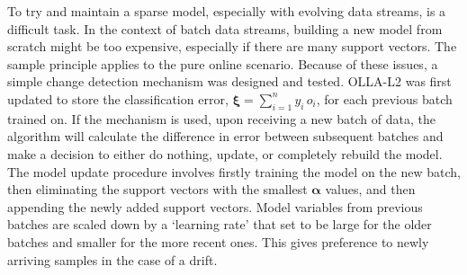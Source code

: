 \documentclass[reqno]{vcuthesis}
\numberwithin{equation}{chapter}
\begin{document}
To try and maintain a sparse model, especially with evolving data streams, is a difficult task. In the context of batch data streams, building a new model from scratch might be too expensive, especially if there are many support vectors. The sample principle applies to the pure online scenario. Because of these issues, a simple change detection mechanism was designed and tested. OLLA-L2 was first updated to store the classification error, $\bm \xi = \sum_{i=1}^n y_i\, o_i$, for each previous batch trained on. If the mechanism is used, upon receiving a new batch of data, the algorithm will calculate the difference in error between subsequent batches and make a decision to either do nothing, update, or completely rebuild the model. The model update procedure involves firstly training the model on the new batch, then eliminating the support vectors with the smallest $\bm \alpha$ values, and then appending the newly added support vectors. Model variables from previous batches are scaled down by a `learning rate' that set to be large for the older batches and smaller for the more recent ones. This gives preference to newly arriving samples in the case of a drift. 
\end{document}
